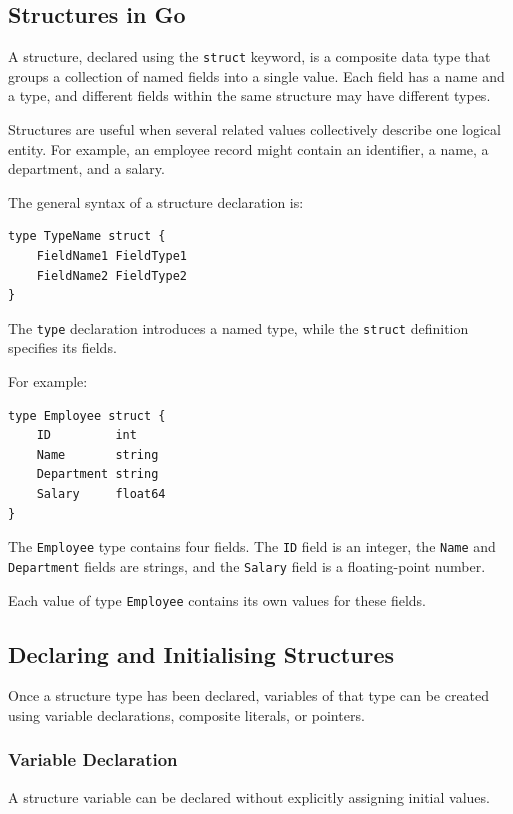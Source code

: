 \subsection{Structures in Go}

A structure, declared using the \texttt{struct} keyword, is a composite data type that groups a collection of named fields into a single value. Each field has a name and a type, and different fields within the same structure may have different types.

Structures are useful when several related values collectively describe one logical entity. For example, an employee record might contain an identifier, a name, a department, and a salary.

The general syntax of a structure declaration is:

\begin{lstlisting}
type TypeName struct {
    FieldName1 FieldType1
    FieldName2 FieldType2
}
\end{lstlisting}

The \texttt{type} declaration introduces a named type, while the \texttt{struct} definition specifies its fields.

For example:

\begin{lstlisting}
type Employee struct {
    ID         int
    Name       string
    Department string
    Salary     float64
}
\end{lstlisting}

The \texttt{Employee} type contains four fields. The \texttt{ID} field is an integer, the \texttt{Name} and \texttt{Department} fields are strings, and the \texttt{Salary} field is a floating-point number.

Each value of type \texttt{Employee} contains its own values for these fields.

\subsection{Declaring and Initialising Structures}

Once a structure type has been declared, variables of that type can be created using variable declarations, composite literals, or pointers.

\subsubsection{Variable Declaration}

A structure variable can be declared without explicitly assigning initial values.

